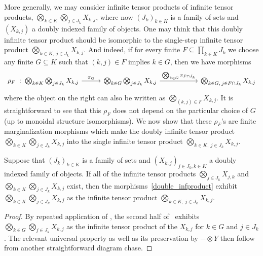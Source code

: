 \documentclass[11pt]{article}
\begin{document}
More generally, we may consider infinite tensor products of infinite tensor products, $\bigotimes_{k \in K} \bigotimes_{j \in J_k} X_{k,j}$, where now $(J_k)_{k \in K}$ is a family of sets and $(X_{k,j})$ a doubly indexed family of objects. One may think that this doubly infinite tensor product should be isomorphic to the single-step infinite tensor product $\bigotimes_{k \in K, \: j \in J_k} X_{k,j}$. And indeed, if for every finite $F \subseteq \prod_{k \in K} J_k$ we choose any finite $G \subseteq K$ such that $(k,j) \in F$ implies $k \in G$, then we have morphisms
\begin{equation}
	\label{double_infproduct}
	\begin{tikzcd}[column sep=1cm]
		\rho_F \; : \; \bigotimes_{k \in K} \bigotimes_{j \in J_k} X_{k,j} \ar{r}{\pi_G} & \bigotimes_{k \in G} \bigotimes_{j \in J_k} X_{k,j} \ar{rr}{\bigotimes_{k \in G} \pi_{F \cap J_k}} & & \bigotimes_{k \in G, \: j \in F \cap J_k} X_{k,j}
	\end{tikzcd}
\end{equation}
where the object on the right can also be written as $\bigotimes_{(k,j) \in F} X_{k,j}$. It is straightforward to see that this $\rho_F$ does not depend on the particular choice of $G$ (up to monoidal structure isomorphisms). We now show that these $\rho_F$'s are finite marginalization morphisms which make the doubly infinite tensor product $\bigotimes_{k \in K} \bigotimes_{j \in J_k} X_{k,j}$ into the single infinite tensor product $\bigotimes_{k \in K, \: j \in J_k} X_{k,j}$.

\begin{lemma}
	\label{infprod_operadic}
	Suppose that $(J_k)_{k \in K}$ is a family of sets and $(X_{k,j})_{j \in J_k, k \in K}$ a doubly indexed family of objects. If all of the infinite tensor products $\bigotimes_{j \in J_k} X_{j,k}$ and $\bigotimes_{k \in K} \bigotimes_{j \in J_k} X_{k,j}$ exist, then the morphisms~\eqref{double_infproduct} exhibit $\bigotimes_{k \in K} \bigotimes_{j \in J_k} X_{k,j}$ as the infinite tensor product $\bigotimes_{k \in K, \: j \in J_k} X_{k,j}$.
\end{lemma}
\begin{proof}
	By repeated application of , the second half of~ exhibits $\bigotimes_{k \in G} \bigotimes_{j \in J_k} X_{k,j}$ as the infinite tensor product of the $X_{k,j}$ for $k \in G$ and $j \in J_k$. The relevant universal property as well as its preservation by $- \otimes Y$ then follow from another straightforward diagram chase.
\end{proof}
\end{document}
